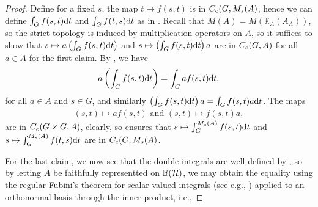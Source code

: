 \begin{proof}
Define for a fixed $s$, the map $t \mapsto f(s,t)$ is in $C_c(G,M_s(A)$, hence we can define $\int_G f(s,t) \mathrm{d} t$ and $\int_G f(t,s) \mathrm{d} t$ as in . Recall that $M(A) = M(\mathbb{K}_A(A_A))$, so the strict topology is induced by multiplication operators on $A$, so it suffices to show that $s \mapsto a \left(\int_Gf(s,t) \mathrm{d} t\right)$ and $s \mapsto \left(\int_G f(s,t) \mathrm{d} t\right) a $ are in $C_c(G,A)$ for all $ a \in A$ for the first claim. By , we have 
\begin{align*}
a \left( \int_G f(s,t) \mathrm{d} t \right) = \int_G a f(s,t) \mathrm{d} t,
\end{align*}
for all $a \in A$ and $s \in G$, and similarly $\left( \int_G f(s,t) \mathrm{d} t \right)a = \int_G f(s,t) a \mathrm{d} t$. The maps 
\begin{align*}
	(s,t) \mapsto a f(s,t) \text{ and } (s,t) \mapsto f(s,t) a,
\end{align*}
are in $C_c(G \times G , A)$, clearly, so  ensures that $s \mapsto \int_G^{M_s(A)} f(s,t) \mathrm{d} t$ and $s \mapsto \int_G ^{M_s(A)} f(t,s) \mathrm{d} t$ are in $C_c(G,M_s(A)$.

For the last claim, we now see that the double integrals are well-defined by , so by letting $A$ be faithfully representted on $\mathbb{B}(\mathcal{H})$, we may obtain the equality using the regular Fubini's theorem for scalar valued integrals (see e.g., \cite{schilling}) applied to an orthonormal basis through the inner-product, i.e.,
\end{proof}


